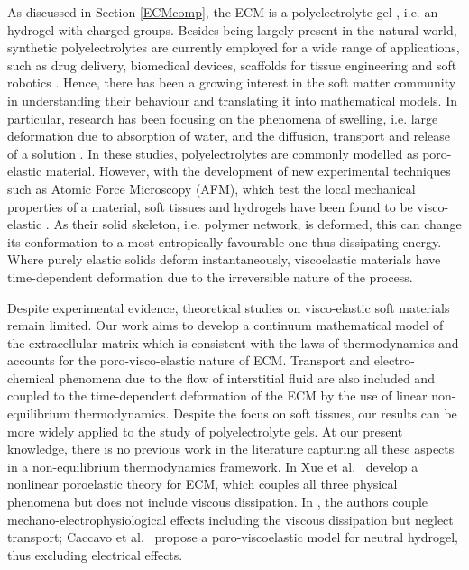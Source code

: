 As discussed in Section \ref{ECMcomp}, the ECM is a polyelectrolyte gel \cite{ecm1,ecm2}, i.e. an hydrogel with charged groups. Besides being largely present in the natural world, synthetic polyelectrolytes are currently employed for a wide range of applications, such as drug delivery, biomedical devices, scaffolds for tissue engineering and soft robotics \cite{hydroex3,hydroex2,hydroex1,hydroex4}. Hence, there has been a growing interest in the soft matter community in understanding their behaviour and translating it into mathematical models. In particular, research has been focusing on the phenomena of swelling, i.e. large deformation due to absorption of water, and the diffusion, transport and release of a solution \cite{DROZDOV+,DROZDOVph,Reviewpolyel,swell2}. In these studies, polyelectrolytes are commonly modelled as poro-elastic material. However, with the development of new experimental techniques such as Atomic Force Microscopy (AFM), which test the local mechanical properties of a material, soft tissues and hydrogels have been found to be visco-elastic \cite{ex5}. As their solid skeleton, i.e. polymer network, is deformed, this can change its conformation to a most entropically favourable one thus dissipating energy. Where purely elastic solids deform instantaneously, viscoelastic materials have time-dependent deformation due to the irreversible nature of the process. 

Despite experimental evidence, theoretical studies on visco-elastic soft materials remain limited. Our work aims to develop a continuum mathematical model of the extracellular matrix which is consistent with the laws of thermodynamics and accounts for the poro-visco-elastic nature of ECM. Transport and electro-chemical phenomena due to the flow of interstitial fluid are also included and coupled to the time-dependent deformation of the ECM by the use of linear non-equilibrium thermodynamics. Despite the focus on soft tissues, our results can be more widely applied to the study of polyelectrolyte gels. At our present knowledge, there is no previous work in the literature capturing all these aspects in a non-equilibrium thermodynamics framework. In \cite{ecm1,ecm2} Xue et al.~ develop a nonlinear poroelastic theory for ECM, which couples all three physical phenomena but does not include viscous dissipation. In \cite{Jeru}, the authors couple mechano-electrophysiological effects including the viscous dissipation but neglect transport; Caccavo et al.~ \cite{Article1} propose a poro-viscoelastic model for neutral hydrogel, thus excluding electrical effects.

